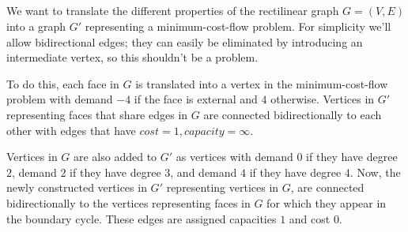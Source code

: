 
\subsection{}

We want to translate the different properties of the rectilinear graph
$G = (V, E)$ into a graph $G'$ representing a minimum-cost-flow
problem. For simplicity we'll allow bidirectional edges; they can
easily be eliminated by introducing an intermediate vertex, so this
shouldn't be a problem.

To do this, each face in $G$ is translated into a vertex in the
minimum-cost-flow problem with demand $-4$ if the face is external and
$4$ otherwise. Vertices in $G'$ representing faces that share edges in
$G$ are connected bidirectionally to each other with edges that have $cost = 1,
capacity = \infty $.

Vertices in $G$ are also added to $G'$ as vertices with demand $0$ if
they have degree $2$, demand $2$ if they have degree $3$, and demand
$4$ if they have degree $4$. Now, the newly constructed vertices in
$G'$ representing vertices in $G$, are connected bidirectionally to
the vertices representing faces in $G$ for which they appear in the
boundary cycle. These edges are assigned capacities $1$ and cost $0$.
